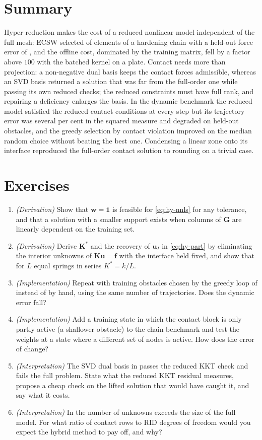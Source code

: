 \section{Summary}\label{sec:hy-summary}

Hyper-reduction makes the cost of a reduced nonlinear model independent of the full mesh: ECSW selected \cecFourEN{} of \cecNElem{} elements of a hardening chain with a held-out force error of \cecFourEErr, and the offline cost, dominated by the training matrix, fell by a factor above $100$ with the batched kernel on a plate. Contact needs more than projection: a non-negative dual basis keeps the contact forces admissible, whereas an SVD basis returned a solution that was far from the full-order one while passing its own reduced checks; the reduced constraints must have full rank, and repairing a deficiency enlarges the basis. In the dynamic benchmark the reduced model satisfied the reduced contact conditions at every step but its trajectory error was several per cent in the squared measure and degraded on held-out obstacles, and the greedy selection by contact violation improved on the median random choice without beating the best one. Condensing a linear zone onto its interface reproduced the full-order contact solution to rounding on a trivial case.

\section*{Exercises}\label{sec:hy-exercises}
\begin{enumerate}
\item \emph{(Derivation)} Show that $\bm w=\bm 1$ is feasible for \eqref{eq:hy-nnls} for any tolerance, and that a solution with a smaller support exists when columns of $\bm G$ are linearly dependent on the training set.
\item \emph{(Derivation)} Derive $\bm K^*$ and the recovery of $\bm u_I$ in \eqref{eq:hy-part} by eliminating the interior unknowns of $\bm K\bm u=\bm f$ with the interface held fixed, and show that for $L$ equal springs in series $K^*=k/L$.
\item \emph{(Implementation)} Repeat  with training obstacles chosen by the greedy loop of  instead of by hand, using the same number of trajectories. Does the dynamic error fall?
\item \emph{(Implementation)} Add a training state in which the contact block is only partly active (a shallower obstacle) to the chain benchmark and test the weights at a state where a different set of nodes is active. How does the error of  change?
\item \emph{(Interpretation)} The SVD dual basis in  passes the reduced KKT check and fails the full problem. State what the reduced KKT residual measures, propose a cheap check on the lifted solution that would have caught it, and say what it costs.
\item \emph{(Interpretation)} In  the number of unknowns exceeds the size of the full model. For what ratio of contact rows to RID degrees of freedom would you expect the hybrid method to pay off, and why?
\end{enumerate}

\chapterrefs
